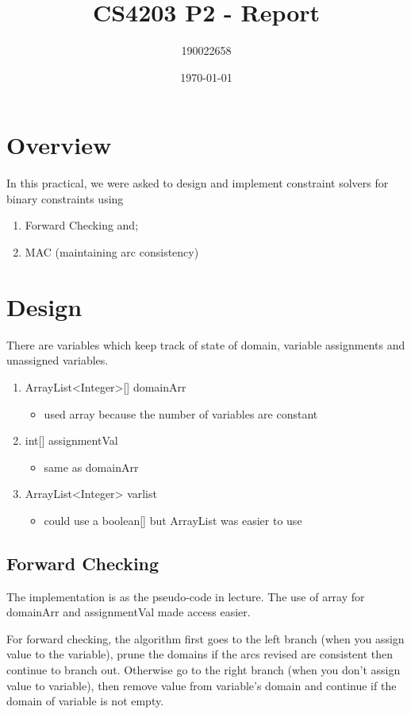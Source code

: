 \documentclass[11pt]{article}
\author{190022658}
\date{\today}
\title{CS4203 P2 - Report}
\begin{document}
\maketitle

\section{Overview}
\label{sec:orgab9db2d}
In this practical, we were asked to design and implement constraint solvers for binary constraints using
\begin{enumerate}
\item Forward Checking and;
\item MAC (maintaining arc consistency)
\end{enumerate}

\section{Design}
\label{sec:orgffb967c}
There are variables which keep track of state of domain, variable assignments and unassigned variables.
\begin{enumerate}
\item ArrayList<Integer>[] domainArr
\begin{itemize}
\item used array because the number of variables are constant
\end{itemize}
\item int[] assignmentVal
\begin{itemize}
\item same as domainArr
\end{itemize}
\item ArrayList<Integer> varlist
\begin{itemize}
\item could use a boolean[] but ArrayList was easier to use
\end{itemize}
\end{enumerate}

\subsection{Forward Checking}
\label{sec:org3ed0dcc}
The implementation is as the pseudo-code in lecture. The use of array for domainArr and assignmentVal made access easier.

For forward checking, the algorithm first goes to the left branch (when you assign value to the variable), prune the domains if the arcs revised are consistent then continue to branch out. Otherwise go to the right branch (when you don't assign value to variable), then remove value from variable's domain and continue if the domain of variable is not empty.
\end{document}
